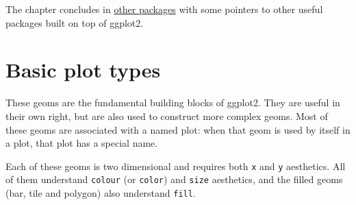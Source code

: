 The chapter concludes in \protect\hyperlink{sec:elsewhere}{other
packages} with some pointers to other useful packages built on top of
ggplot2.

\hypertarget{sec:basics}{%
\section{Basic plot types}\label{sec:basics}}

These geoms are the fundamental building blocks of ggplot2. They are
useful in their own right, but are also used to construct more complex
geoms. Most of these geoms are associated with a named plot: when that
geom is used by itself in a plot, that plot has a special name.

Each of these geoms is two dimensional and requires both \texttt{x} and
\texttt{y} aesthetics. All of them understand \texttt{colour} (or
\texttt{color}) and \texttt{size} aesthetics, and the filled geoms (bar,
tile and polygon) also understand \texttt{fill}.

